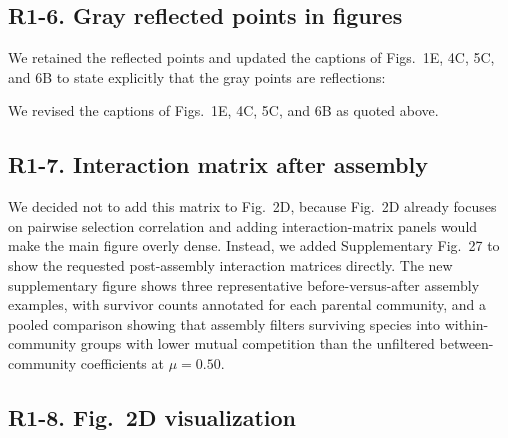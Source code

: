 \subsection*{R1-6. Gray reflected points in figures}


\responselabel
We retained the reflected points and updated the captions of Figs.~1E, 4C, 5C, and 6B to state explicitly that the gray points are reflections: 

We revised the captions of Figs.~1E, 4C, 5C, and 6B as quoted above.


\subsection*{R1-7. Interaction matrix after assembly}


\responselabel
We decided not to add this matrix to Fig.~2D, because Fig.~2D already focuses on pairwise selection correlation and adding interaction-matrix panels would make the main figure overly dense. Instead, we added Supplementary Fig.~27 to show the requested post-assembly interaction matrices directly. The new supplementary figure shows three representative before-versus-after assembly examples, with survivor counts annotated for each parental community, and a pooled comparison showing that assembly filters surviving species into within-community groups with lower mutual competition than the unfiltered between-community coefficients at $\mu = 0.50$.

\subsection*{R1-8. Fig.~2D visualization}


